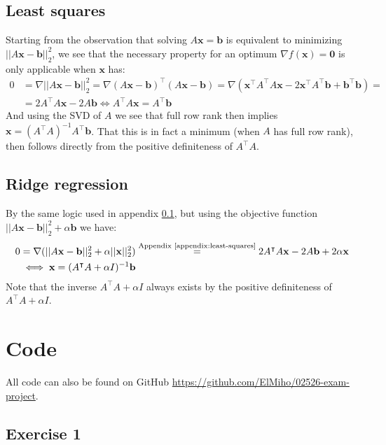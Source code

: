 \documentclass{article}
\begin{document}
\subsection{Least squares}\label{appendix:least-squares}
Starting from the observation that solving $A\mathbf{x} = \mathbf{b}$ is equivalent to minimizing $||A\mathbf{x} - \mathbf{b}||_2^{2}$, we see that the necessary property for an optimum $\nabla f(\mathbf{x}) = \mathbf{0}$ is only applicable when $\mathbf{x}$ has:
\begin{align}
    0 &= \nabla ||A\mathbf{x} - \mathbf{b}||_2^{2} = \nabla (A\mathbf{x} - \mathbf{b})^\intercal (A\mathbf{x} - \mathbf{b}) = \nabla \left(\mathbf{x}^\intercal A^\intercal A \mathbf{x} - 2\mathbf{x}^\intercal A^\intercal \mathbf{b} + \mathbf{b}^\intercal \mathbf{b} \right) =  \\
    &= 2A^\intercal A \mathbf{x} - 2A\mathbf{b} \iff A^\intercal A \mathbf{x} = A^\intercal\mathbf{b}
\end{align}
And using the SVD of $A$ we see that full row rank then implies $\mathbf{x} = (A^\intercal A)^{-1} A^\intercal\mathbf{b}$. That this is in fact a minimum (when $A$ has full row rank), then follows directly from the positive definiteness of $A^\intercal A$.

\subsection{Ridge regression}\label{appendix:ridge-time}
By the same logic used in appendix \ref{appendix:least-squares}, but using the objective function $||A\mathbf{x} - \mathbf{b}||_2^2 + \alpha \mathbf{b}$ we have:
\begin{align}
    0 &= \nabla (||A\mathbf{x} - \mathbf{b}||_2^{2} + \alpha ||\mathbf{x}||_2^{2}) \stackrel{\textrm{Appendix \ref{appendix:least-squares}}}{=} 2A^\intercal A \mathbf{x} - 2A\mathbf{b} + 2\alpha \mathbf{x} \\
    &\iff \mathbf{x} = (A^\intercal A + \alpha I)^{-1} \mathbf{b}
\end{align}
Note that the inverse $A^\intercal A + \alpha I$ always exists by the positive definiteness of $A^\intercal A + \alpha I$.


\section{Code}
All code can also be found on GitHub \url{https://github.com/ElMiho/02526-exam-project}. 

\subsection{Exercise 1}
\end{document}
